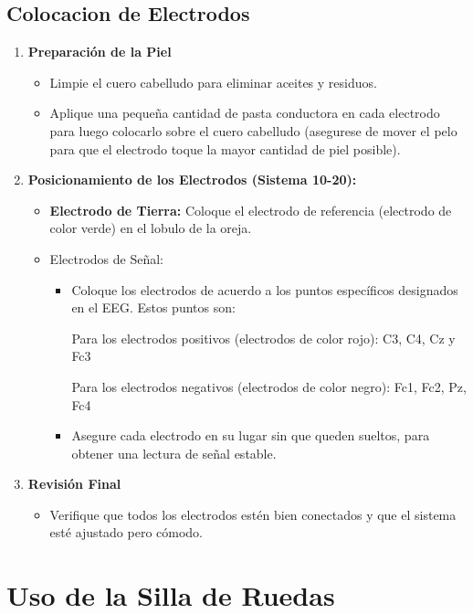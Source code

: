 \documentclass{article}
\begin{document}
\subsection{Colocacion de Electrodos}
\begin{enumerate}
    \item \textbf{Preparación de la Piel}
    \begin{itemize}
        \item Limpie el cuero cabelludo para eliminar aceites y residuos.
        \item Aplique una pequeña cantidad de pasta conductora en cada electrodo para luego colocarlo sobre el cuero cabelludo (asegurese de mover el pelo para que el electrodo toque la mayor cantidad de piel posible).
    \end{itemize}
    \item \textbf{Posicionamiento de los Electrodos (Sistema 10-20):}
    \begin{itemize}
        \item \textbf{Electrodo de Tierra:} Coloque el electrodo de referencia (electrodo de color verde) en el lobulo de la oreja.
        \item Electrodos de Señal:
        \begin{itemize}
            \item Coloque los electrodos de acuerdo a los puntos específicos designados en el EEG. Estos puntos son:
            
            Para los electrodos positivos (electrodos de color rojo): C3, C4, Cz y Fc3
            
            Para los electrodos negativos (electrodos de color negro): Fc1, Fc2, Pz, Fc4
            \item Asegure cada electrodo en su lugar sin que queden sueltos, para obtener una lectura de señal estable.
        \end{itemize}
    \end{itemize}
    \item \textbf{Revisión Final}
    \begin{itemize}
        \item Verifique que todos los electrodos estén bien conectados y que el sistema esté ajustado pero cómodo.
    \end{itemize}
    
\end{enumerate}


\section{Uso de la Silla de Ruedas}
\end{document}
